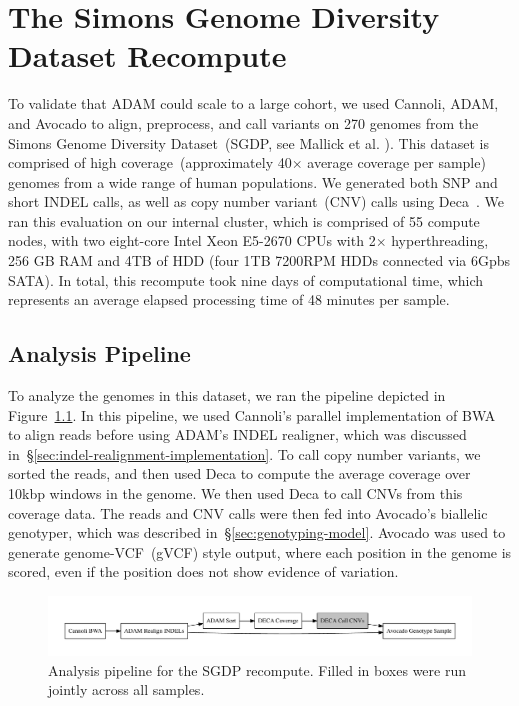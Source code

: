 \documentclass[phd]{ucbthesis}
\begin{document}
\chapter{The Simons Genome Diversity Dataset Recompute}
\label{chap:sgdd}

To validate that ADAM could scale to a large cohort, we used Cannoli, ADAM, and
Avocado to align, preprocess, and call variants on 270 genomes from the Simons
Genome Diversity Dataset~(SGDP, see Mallick et al. \cite{mallick16}). This dataset
is comprised of high
coverage~(approximately 40$\times$ average coverage per sample) genomes from a
wide range of human populations. We generated both SNP and short INDEL calls, as
well as copy number variant~(CNV) calls using Deca~\cite{linderman17}. We ran this
evaluation on our internal cluster, which is comprised of 55 compute nodes, with
two eight-core Intel Xeon E5-2670 CPUs with 2$\times$ hyperthreading, 256 GB RAM
and 4TB of HDD (four 1TB 7200RPM HDDs connected via 6Gpbs SATA). In total, this
recompute took nine days of computational time, which represents an average
elapsed processing time of 48 minutes per sample.

\section{Analysis Pipeline}
\label{sec:analysis-pipeline}

To analyze the genomes in this dataset, we ran the pipeline depicted in
Figure~\ref{fig:sgdp-pipeline}. In this pipeline, we used Cannoli's parallel
implementation of BWA~\cite{li13} to align reads before using ADAM's
INDEL realigner, which was discussed in~\S\ref{sec:indel-realignment-implementation}.
To call copy number variants, we sorted the reads, and then used Deca to compute
the average coverage over 10kbp windows in the genome. We then used Deca to call
CNVs from this coverage data. The reads and CNV calls were then fed into
Avocado's biallelic genotyper, which was described in~\S\ref{sec:genotyping-model}.
Avocado was used to generate genome-VCF~(gVCF) style output, where each position
in the genome is scored, even if the position does not show evidence of
variation.

\begin{figure}[h]
  \begin{center}
    \includegraphics[width=0.95\linewidth]{graphs/pipeline.pdf}
  \end{center}
  \caption{Analysis pipeline for the SGDP recompute. Filled in boxes were run
    jointly across all samples.}
  \label{fig:sgdp-pipeline}
\end{figure}
\end{document}
